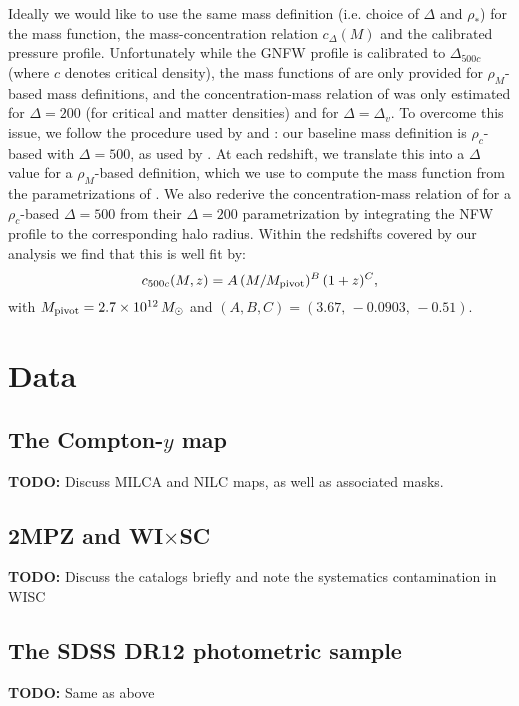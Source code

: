 \documentclass[useAMS,usenatbib]{mn2e}
\newcommand{\TODO}[1]{{\bf TODO:} #1}
\begin{document}
      Ideally we would like to use the same mass definition (i.e. choice of $\Delta$ and $\rho_*$) for the mass function, the mass-concentration relation $c_\Delta(M)$ and the calibrated pressure profile. Unfortunately while the GNFW profile is calibrated to $\Delta_{500c}$ (where $c$ denotes critical density), the mass functions of \cite{2008ApJ...688..709T,2010ApJ...724..878T} are only provided for $\rho_M$-based mass definitions, and the concentration-mass relation of \cite{2008MNRAS.390L..64D} was only estimated for $\Delta=200$ (for critical and matter densities) and for $\Delta=\Delta_v$. To overcome this issue, we follow the procedure used by \cite{2016A&A...594A..24P} and \cite{2018MNRAS.477.4957B}: our baseline mass definition is $\rho_c$-based with $\Delta=500$, as used by \cite{2010A&A...517A..92A}. At each redshift, we translate this into a $\Delta$ value for a $\rho_M$-based definition, which we use to compute the mass function from the parametrizations of \cite{2008ApJ...688..709T,2010ApJ...724..878T}. We also rederive the concentration-mass relation of \cite{2008MNRAS.390L..64D} for a $\rho_c$-based $\Delta=500$ from their $\Delta=200$ parametrization by integrating the NFW profile to the corresponding halo radius. Within the redshifts covered by our analysis we find that this is well fit by:
      \begin{equation}
        c_{500c}(M,z)= A\,(M/M_{\rm pivot})^B\,(1+z)^C,
      \end{equation}
      with $M_{\rm pivot}=2.7\times10^{12}\,M_\odot$ and $(A,B,C)=(3.67,\,-0.0903,\,-0.51)$.

\section{Data}\label{sec:data}
  \subsection{The Compton-$y$ map}\label{ssec:data.y}
    \TODO{Discuss MILCA and NILC maps, as well as associated masks.}
  \subsection{2MPZ and WI$\times$SC}\label{ssec:data.g1}
    \TODO{Discuss the catalogs briefly and note the systematics contamination in WISC}
  \subsection{The SDSS DR12 photometric sample}\label{ssec:data.g2}
    \TODO{Same as above}
\end{document}
